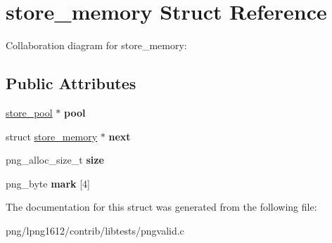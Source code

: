 \hypertarget{structstore__memory}{\section{store\+\_\+memory Struct Reference}
\label{structstore__memory}
}


Collaboration diagram for store\+\_\+memory\+:
\subsection*{Public Attributes}
\begin{DoxyCompactItemize}
\item 
\hypertarget{structstore__memory_af90e7c55760fb5a78a4f0ba1338f8bf2}{\hyperlink{structstore__pool}{store\+\_\+pool} $\ast$ {\bfseries pool}}\label{structstore__memory_af90e7c55760fb5a78a4f0ba1338f8bf2}

\item 
\hypertarget{structstore__memory_a4c32d84a1517155a75dc7c9e37265d23}{struct \hyperlink{structstore__memory}{store\+\_\+memory} $\ast$ {\bfseries next}}\label{structstore__memory_a4c32d84a1517155a75dc7c9e37265d23}

\item 
\hypertarget{structstore__memory_ad1f3b4308aa54b4fb253fc59ed656dc8}{png\+\_\+alloc\+\_\+size\+\_\+t {\bfseries size}}\label{structstore__memory_ad1f3b4308aa54b4fb253fc59ed656dc8}

\item 
\hypertarget{structstore__memory_a15bd69f28d639d737b6eaa6617e716a0}{png\+\_\+byte {\bfseries mark} \mbox{[}4\mbox{]}}\label{structstore__memory_a15bd69f28d639d737b6eaa6617e716a0}

\end{DoxyCompactItemize}


The documentation for this struct was generated from the following file\+:\begin{DoxyCompactItemize}
\item 
png/lpng1612/contrib/libtests/pngvalid.\+c\end{DoxyCompactItemize}

